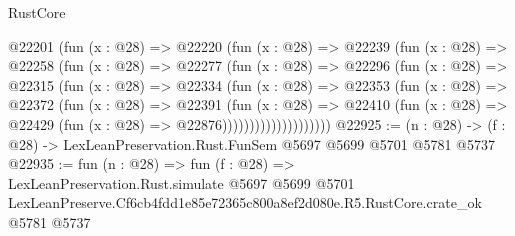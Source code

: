 \begin{lexlean}{RustCore}
\begin{coremodule}
                @22201
                  (fun (x : @28) =>
                  @22220
                    (fun (x : @28) =>
                    @22239
                      (fun (x : @28) =>
                      @22258
                        (fun (x : @28) =>
                        @22277
                          (fun (x : @28) =>
                          @22296
                            (fun (x : @28) =>
                            @22315
                              (fun (x : @28) =>
                              @22334
                                (fun (x : @28) =>
                                @22353
                                  (fun (x : @28) =>
                                  @22372
                                    (fun (x : @28) =>
                                    @22391
                                      (fun (x : @28) =>
                                      @22410
                                        (fun (x : @28) =>
                                        @22429 (fun (x : @28) => @22876))))))))))))))))))))
@22925 := (n : @28) -> (f : @28) -> LexLeanPreservation.Rust.FunSem @5697 @5699 @5701 @5781 @5737
@22935 := fun (n : @28) =>
  fun (f : @28) =>
  LexLeanPreservation.Rust.simulate
    @5697
    @5699
    @5701
    LexLeanPreserve.Cf6cb4fdd1e85e72365c800a8ef2d080e.R5.RustCore.crate_ok
    @5781
    @5737
\end{coremodule}
\end{lexlean}
